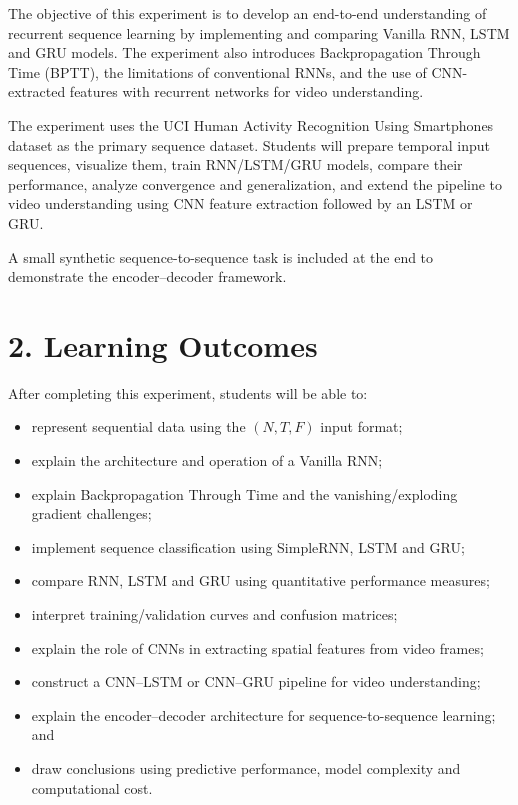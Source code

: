 \documentclass[10pt]{article}
\begin{document}
The objective of this experiment is to develop an end-to-end understanding of
recurrent sequence learning by implementing and comparing Vanilla RNN, LSTM
and GRU models. The experiment also introduces Backpropagation Through Time
(BPTT), the limitations of conventional RNNs, and the use of CNN-extracted
features with recurrent networks for video understanding.

The experiment uses the UCI Human Activity Recognition Using Smartphones
dataset as the primary sequence dataset. Students will prepare temporal input
sequences, visualize them, train RNN/LSTM/GRU models, compare their
performance, analyze convergence and generalization, and extend the pipeline
to video understanding using CNN feature extraction followed by an LSTM or
GRU.

A small synthetic sequence-to-sequence task is included at the end to
demonstrate the encoder--decoder framework.

\section*{2. Learning Outcomes}

After completing this experiment, students will be able to:

\begin{itemize}
\item represent sequential data using the $(N,T,F)$ input format;
\item explain the architecture and operation of a Vanilla RNN;
\item explain Backpropagation Through Time and the vanishing/exploding gradient challenges;
\item implement sequence classification using SimpleRNN, LSTM and GRU;
\item compare RNN, LSTM and GRU using quantitative performance measures;
\item interpret training/validation curves and confusion matrices;
\item explain the role of CNNs in extracting spatial features from video frames;
\item construct a CNN--LSTM or CNN--GRU pipeline for video understanding;
\item explain the encoder--decoder architecture for sequence-to-sequence learning; and
\item draw conclusions using predictive performance, model complexity and computational cost.
\end{itemize}
\end{document}
